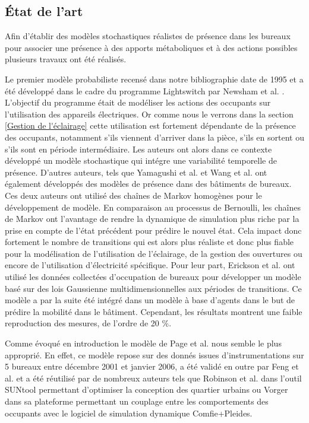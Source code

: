 \subsection{État de l'art}

Afin d'établir des modèles stochastiques réalistes de présence dans les bureaux pour associer une présence à des apports métaboliques et à des actions possibles plusieurs travaux ont été réalisés.

Le premier modèle probabiliste recensé dans notre bibliographie date de 1995 et a été développé dans le cadre du programme Lightswitch par Newsham et al. \cite{Newsham-95}. L'objectif du programme était de modéliser les actions des occupants sur l'utilisation des appareils électriques. Or comme nous le verrons dans la section \ref {Gestion de l'éclairage} cette utilisation est fortement dépendante de la présence des occupants, notamment s'ils viennent d'arriver dans la pièce, s'ils en sortent ou s'ils sont en période intermédiaire. Les auteurs ont alors dans ce contexte développé un modèle stochastique qui intégre une variabilité temporelle de présence. D'autres auteurs, tels que Yamagushi et al. \cite{Yamaguchi-03} et Wang et al. \cite{Wang-05} ont également développés des modèles de présence dans des bâtiments de bureaux. Ces deux auteurs ont utilisé des chaînes de Markov homogènes pour le développement de modèle. En comparaison au processus de Bernoulli, les chaînes de Markov ont l'avantage de rendre la dynamique de simulation plus riche par la prise en compte de l'état précédent pour prédire le nouvel état. Cela impact donc fortement le nombre de transitions qui est alors plus réaliste et donc plus fiable pour la modélisation de l'utilisation de l'éclairage, de la gestion des ouvertures ou encore de l'utilisation d'électricité spécifique. Pour leur part, Erickson et al. \cite{Erickson-09} ont utilisé les données collectées d'occupation de bureaux pour développer un modèle basé sur des lois Gaussienne multidimensionnelles aux périodes de transitions. Ce modèle a par la suite été intégré dans un modèle à base d'agents dans le but de prédire la mobilité dans le bâtiment. Cependant, les résultats montrent une faible reproduction des mesures, de l'ordre de 20 \%.

Comme évoqué en introduction le modèle de Page et al. \cite{Page-08} nous semble le plus approprié. En effet, ce modèle repose sur des donnés issues d'instrumentations sur 5 bureaux entre décembre 2001 et janvier 2006, a été validé en outre par Feng et al. \cite{Feng-15} et a été réutilisé par de nombreux auteurs tels que Robinson et al. \cite{Robinson-07} dans l'outil SUNtool permettant d'optimiser la conception des quartier urbains ou Vorger \cite{Vorger-14} dans sa plateforme permettant un couplage entre les comportements des occupants avec le logiciel de simulation dynamique Comfie+Pleides.

